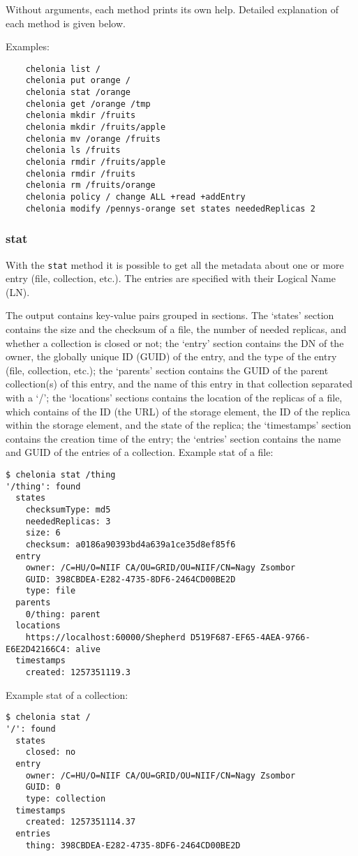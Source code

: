 
Without arguments, each method prints its own help. Detailed explanation of each method is given below.

Examples:
\begin{verbatim}
    chelonia list /
    chelonia put orange /
    chelonia stat /orange
    chelonia get /orange /tmp
    chelonia mkdir /fruits
    chelonia mkdir /fruits/apple
    chelonia mv /orange /fruits
    chelonia ls /fruits
    chelonia rmdir /fruits/apple
    chelonia rmdir /fruits
    chelonia rm /fruits/orange
    chelonia policy / change ALL +read +addEntry
    chelonia modify /pennys-orange set states neededReplicas 2
\end{verbatim}

\subsubsection{stat} %
\label{ssub:stat}
With the \texttt{stat}  method it is possible to get all the metadata about one or more entry (file, collection, etc.). The entries are specified with their Logical Name (LN).
\hspace*{0.5cm}
\begin{shaded}
\end{shaded}

The output contains key-value pairs grouped in sections. The `states' section contains the size and the checksum of a file, the number of needed replicas, and whether a collection is closed or not; the `entry' section contains the DN of the owner, the globally unique ID (GUID) of the entry, and the type of the entry (file, collection, etc.); the `parents' section contains the GUID of the parent collection(s) of this entry, and the name of this entry in that collection separated with a `/'; the `locations' sections contains the location of the replicas of a file, which contains of the ID (the URL) of the storage element, the ID of the replica within the storage element, and the state of the replica; the `timestamps' section contains the creation time of the entry; the `entries' section contains the name and GUID of the entries of a collection.
Example stat of a file:
\begin{verbatim}
$ chelonia stat /thing
'/thing': found
  states
    checksumType: md5
    neededReplicas: 3
    size: 6
    checksum: a0186a90393bd4a639a1ce35d8ef85f6
  entry
    owner: /C=HU/O=NIIF CA/OU=GRID/OU=NIIF/CN=Nagy Zsombor
    GUID: 398CBDEA-E282-4735-8DF6-2464CD00BE2D
    type: file
  parents
    0/thing: parent
  locations
    https://localhost:60000/Shepherd D519F687-EF65-4AEA-9766-E6E2D42166C4: alive
  timestamps
    created: 1257351119.3
\end{verbatim}
Example stat of a collection:
\begin{verbatim}
$ chelonia stat /
'/': found
  states
    closed: no
  entry
    owner: /C=HU/O=NIIF CA/OU=GRID/OU=NIIF/CN=Nagy Zsombor
    GUID: 0
    type: collection
  timestamps
    created: 1257351114.37
  entries
    thing: 398CBDEA-E282-4735-8DF6-2464CD00BE2D    
\end{verbatim}

